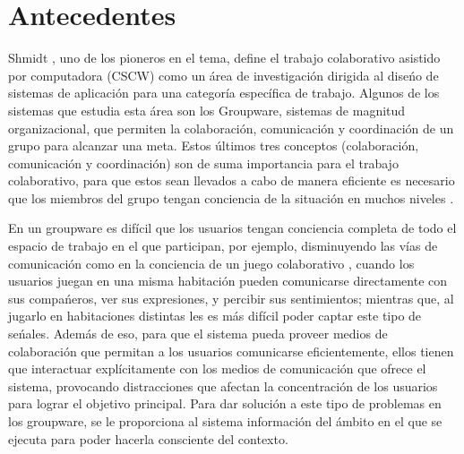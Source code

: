 \section{Antecedentes}
Shmidt \cite{schmidt1992taking}, uno de los pioneros en el tema, define el trabajo colaborativo asistido por computadora (CSCW) como un \'area de investigaci\'on dirigida al dise\'no de sistemas de aplicaci\'on para una categor\'ia espec\'ifica de trabajo. Algunos de los sistemas que estudia esta \'area son los Groupware, sistemas de magnitud organizacional, que permiten la colaboraci\'on, comunicaci\'on y coordinaci\'on de un grupo para alcanzar una meta. Estos \'ultimos tres conceptos (colaboraci\'on, comunicaci\'on y coordinaci\'on) son de suma importancia para el trabajo colaborativo, para que estos sean llevados a cabo de manera eficiente es necesario que los miembros del grupo tengan conciencia de la situaci\'on en muchos niveles \cite{gutwin1996supporting}. 

En un groupware es dif\'icil que los usuarios tengan conciencia completa de todo el espacio de trabajo en el que participan, por ejemplo, disminuyendo las v\'ias de comunicaci\'on como  en la conciencia de un juego colaborativo \cite{montane2013context}, cuando los usuarios juegan en una misma habitaci\'on pueden comunicarse directamente con sus compa\'neros, ver sus expresiones, y percibir sus sentimientos; mientras que, al jugarlo en habitaciones distintas les es m\'as dif\'icil poder captar este tipo de se\'nales. Adem\'as de eso, para que el sistema pueda proveer medios de colaboraci\'on que permitan a los usuarios comunicarse eficientemente, ellos tienen que interactuar expl\'icitamente con los medios de comunicaci\'on que ofrece el sistema, provocando distracciones que afectan la concentraci\'on de los usuarios para lograr el objetivo principal. Para dar soluci\'on a este tipo de problemas en los groupware, se le proporciona al sistema informaci\'on del \'ambito en el que se ejecuta para poder hacerla consciente del contexto.
 
